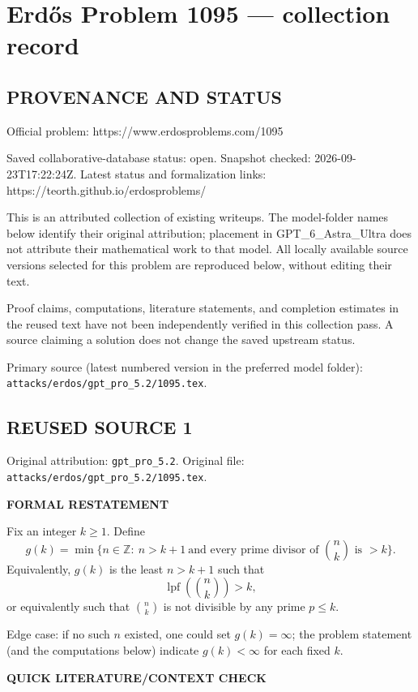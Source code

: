 \section*{Erd\H{o}s Problem 1095 --- collection record}

\subsection*{PROVENANCE AND STATUS}
Official problem: https://www.erdosproblems.com/1095

Saved collaborative-database status: open.
Snapshot checked: 2026-09-23T17:22:24Z.
Latest status and formalization links: https://teorth.github.io/erdosproblems/

This is an attributed collection of existing writeups. The model-folder names below identify their original attribution; placement in GPT\_6\_Astra\_Ultra does not attribute their mathematical work to that model. All locally available source versions selected for this problem are reproduced below, without editing their text.

Proof claims, computations, literature statements, and completion estimates in the reused text have not been independently verified in this collection pass. A source claiming a solution does not change the saved upstream status.

Primary source (latest numbered version in the preferred model folder): \texttt{attacks/erdos/gpt\_pro\_5.2/1095.tex}.

\subsection*{REUSED SOURCE 1}
Original attribution: \texttt{gpt\_pro\_5.2}.
Original file: \texttt{attacks/erdos/gpt\_pro\_5.2/1095.tex}.


\medskip
\noindent\textbf{FORMAL RESTATEMENT}

\smallskip
\noindent
Fix an integer $k\ge 1$. Define
\[
 g(k)=\min\Big\{n\in\mathbb{Z}:\ n>k+1\ \text{and every prime divisor of }\binom{n}{k}\text{ is }>k\Big\}.
\]
Equivalently, $g(k)$ is the least $n>k+1$ such that
\[
\operatorname{lpf}\!\left(\binom{n}{k}\right)>k,
\]
or equivalently such that $\binom{n}{k}$ is not divisible by any prime $p\le k$.

\smallskip
\noindent
Edge case: if no such $n$ existed, one could set $g(k)=\infty$; the problem statement (and the computations below) indicate $g(k)<\infty$ for each fixed $k$.

\medskip
\noindent\textbf{QUICK LITERATURE/CONTEXT CHECK}


